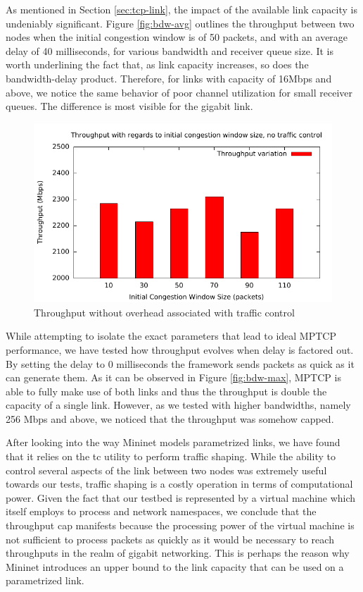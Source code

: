 As mentioned in Section \ref{sec:tcp-link}, the impact of the available link
capacity is undeniably significant. Figure \ref{fig:bdw-avg} outlines the
throughput between two nodes when the initial congestion window is of 50
packets, and with an average delay of 40 milliseconds, for various bandwidth
and receiver queue size. It is worth underlining the fact that, as link
capacity increases, so does the bandwidth-delay product. Therefore, for links
with capacity of 16Mbps and above, we notice the same behavior of poor channel
utilization for small receiver queues. The difference is most visible for the
gigabit link.

\begin{figure}
  \centering
  \includegraphics[width=\textwidth]{img/throughput-cwnd-notc}
  \caption{Throughput without overhead associated with traffic control}
  \label{fig:cwnd-notc}
\end{figure}

While attempting to isolate the exact parameters that lead to ideal MPTCP
performance, we have tested how throughput evolves when delay is factored
out. By setting the delay to 0 milliseconds the framework sends packets as
quick as it can generate them. As it can be observed in Figure
\ref{fig:bdw-max}, MPTCP is able to fully make use of both links and thus the
throughput is double the capacity of a single link. However, as we tested with
higher bandwidths, namely 256 Mbps and above, we noticed that the throughput
was somehow capped.

After looking into the way Mininet models parametrized links, we have found
that it relies on the tc utility to perform traffic shaping. While the ability
to control several aspects of the link between two nodes was extremely useful
towards our tests, traffic shaping is a costly operation in terms of
computational power. Given the fact that our testbed is represented by a
virtual machine which itself employs to process and network namespaces, we
conclude that the throughput cap manifests because the processing power of the
virtual machine is not sufficient to process packets as quickly as it would be
necessary to reach throughputs in the realm of gigabit networking. This is
perhaps the reason why Mininet introduces an upper bound to the link capacity
that can be used on a parametrized link.


